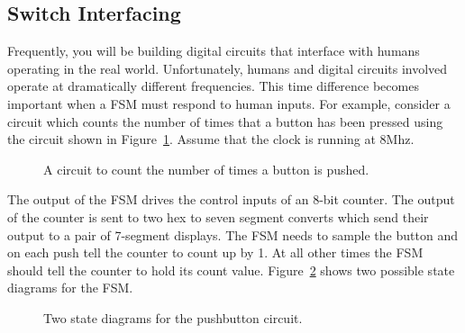 \subsection{Switch Interfacing}
\label{page:push_dp}
Frequently, you will be building digital circuits that interface with
humans operating in the real world.  Unfortunately, humans and digital
circuits involved operate at dramatically different frequencies.  
This time difference becomes important when a FSM must respond to 
human inputs.  For example, consider a circuit which counts the number
of times that a button has been pressed using the circuit shown in 
Figure~\ref{fig:push7button}.  Assume that the clock is running at
8Mhz.

\begin{figure}[ht]
\caption{A circuit to count the number of times a button is pushed.}
\label{fig:push7button}
\end{figure}

The output of the FSM drives the control inputs of an 8-bit counter.
The output of the counter is sent to two hex to seven segment converts 
which send their output to a pair of 7-segment displays.
The FSM needs to sample the button and on each push tell the counter
to count up by 1.  At all other times the FSM should tell the counter
to hold its count value.   Figure~\ref{fig:pushfsm}
shows two possible state diagrams for the FSM.

\begin{figure}[ht]
\caption{Two state diagrams for the pushbutton circuit.}
\label{fig:pushfsm}
\end{figure}

